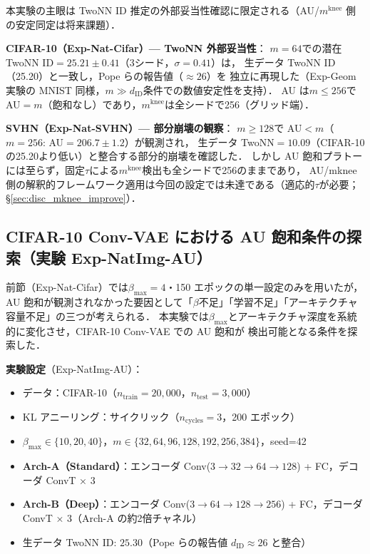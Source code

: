 \documentclass[11pt,a4paper]{jsarticle}
\newcommand{\mknee}{m^{\mathrm{knee}}}
\begin{document}
本実験の主眼は TwoNN ID 推定の外部妥当性確認に限定される（AU/$\mknee$ 側の安定同定は将来課題）．

\textbf{CIFAR-10（Exp-Nat-Cifar）— TwoNN 外部妥当性}：
$m=64$での潜在 TwoNN ID$=25.21\pm0.41$（3シード，$\sigma=0.41$）は，
生データ TwoNN ID（25.20）と一致し，Pope ら\cite{pope2021intrinsic}の報告値（$\approx 26$）を
独立に再現した（Exp-Geom 実験の MNIST 同様，$m \gg d_\mathrm{ID}$条件での数値安定性を支持）．
AU は$m \leq 256$で AU$=m$（飽和なし）であり，$\mknee$は全シードで256（グリッド端）．

\textbf{SVHN（Exp-Nat-SVHN）— 部分崩壊の観察}：
$m \geq 128$で AU$<m$（$m=256$: AU$=206.7\pm1.2$）が観測され，
生データ TwoNN$=10.09$（CIFAR-10の25.20より低い）と整合する部分的崩壊を確認した．
しかし AU 飽和プラトーには至らず，固定$\tau$による$\mknee$検出も全シードで256のままであり，
AU/mknee 側の解釈的フレームワーク適用は今回の設定では未達である（適応的$\tau$が必要；§\ref{sec:disc_mknee_improve}）．

\subsection{CIFAR-10 Conv-VAE における AU 飽和条件の探索（実験 Exp-NatImg-AU）}\label{sec:exp_natimg_au}

前節（Exp-Nat-Cifar）では$\beta_{\max}=4$・150 エポックの単一設定のみを用いたが，
AU 飽和が観測されなかった要因として「$\beta$不足」「学習不足」「アーキテクチャ容量不足」の三つが考えられる．
本実験では$\beta_{\max}$とアーキテクチャ深度を系統的に変化させ，CIFAR-10 Conv-VAE での AU 飽和が
検出可能となる条件を探索した．

\textbf{実験設定}（Exp-NatImg-AU）：
\begin{itemize}
  \item データ：CIFAR-10（$n_{\mathrm{train}}=20{,}000$，$n_{\mathrm{test}}=3{,}000$）
  \item KL アニーリング：サイクリック（$n_{\mathrm{cycles}}=3$，200 エポック）
  \item $\beta_{\max} \in \{10, 20, 40\}$，$m \in \{32, 64, 96, 128, 192, 256, 384\}$，seed=42
  \item \textbf{Arch-A（Standard）}：エンコーダ Conv($3{\to}32{\to}64{\to}128$) + FC，デコーダ ConvT × 3
  \item \textbf{Arch-B（Deep）}：エンコーダ Conv($3{\to}64{\to}128{\to}256$) + FC，デコーダ ConvT × 3（Arch-A の約2倍チャネル）
  \item 生データ TwoNN ID: $25.30$（Pope ら\cite{pope2021intrinsic}の報告値 $d_\mathrm{ID} \approx 26$ と整合）
\end{itemize}
\end{document}
